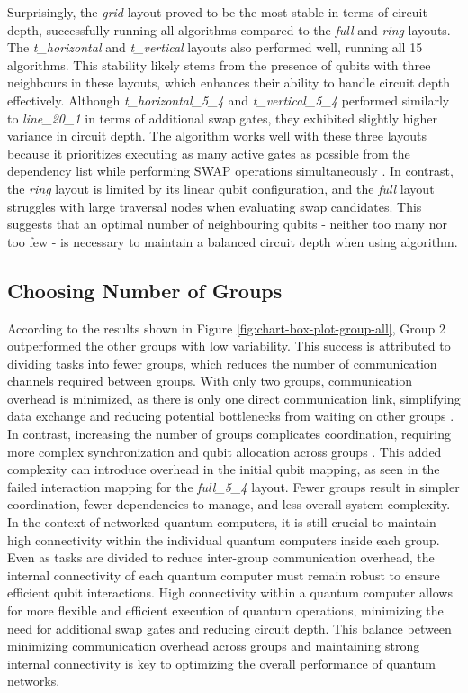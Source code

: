 Surprisingly, the \textit{grid} layout proved to be the most stable in terms of circuit depth, successfully running all algorithms compared to the \textit{full} and \textit{ring} layouts. The \textit{t\_horizontal} and \textit{t\_vertical} layouts also performed well, running all 15 algorithms. This stability likely stems from the presence of qubits with three neighbours in these layouts, which enhances their ability to handle circuit depth effectively. Although \textit{t\_horizontal\_5\_4} and \textit{t\_vertical\_5\_4} performed similarly to \textit{line\_20\_1} in terms of additional swap gates, they exhibited slightly higher variance in circuit depth. The  algorithm works well with these three layouts because it prioritizes executing as many active gates as possible from the dependency list while performing SWAP operations simultaneously \cite{zhang_depth_2020}. In contrast, the \textit{ring} layout is limited by its linear qubit configuration, and the \textit{full} layout struggles with large traversal nodes when evaluating swap candidates. This suggests that an optimal number of neighbouring qubits - neither too many nor too few - is necessary to maintain a balanced circuit depth when using  algorithm.
\subsection{Choosing Number of Groups}
According to the results shown in Figure \ref{fig:chart-box-plot-group-all}, Group 2 outperformed the other groups with low variability. This success is attributed to dividing tasks into fewer groups, which reduces the number of communication channels required between groups. With only two groups, communication overhead is minimized, as there is only one direct communication link, simplifying data exchange and reducing potential bottlenecks from waiting on other groups \cite{cuomo_optimized_2023}. In contrast, increasing the number of groups complicates coordination, requiring more complex synchronization and qubit allocation across groups \cite{cicconetti_resource_2022}. This added complexity can introduce overhead in the initial qubit mapping, as seen in the failed interaction mapping for the \textit{full\_5\_4} layout. Fewer groups result in simpler coordination, fewer dependencies to manage, and less overall system complexity. \\
In the context of networked quantum computers, it is still crucial to maintain high connectivity within the individual quantum computers inside each group. Even as tasks are divided to reduce inter-group communication overhead, the internal connectivity of each quantum computer must remain robust to ensure efficient qubit interactions. High connectivity within a quantum computer allows for more flexible and efficient execution of quantum operations, minimizing the need for additional swap gates and reducing circuit depth. This balance between minimizing communication overhead across groups and maintaining strong internal connectivity is key to optimizing the overall performance of quantum networks.

